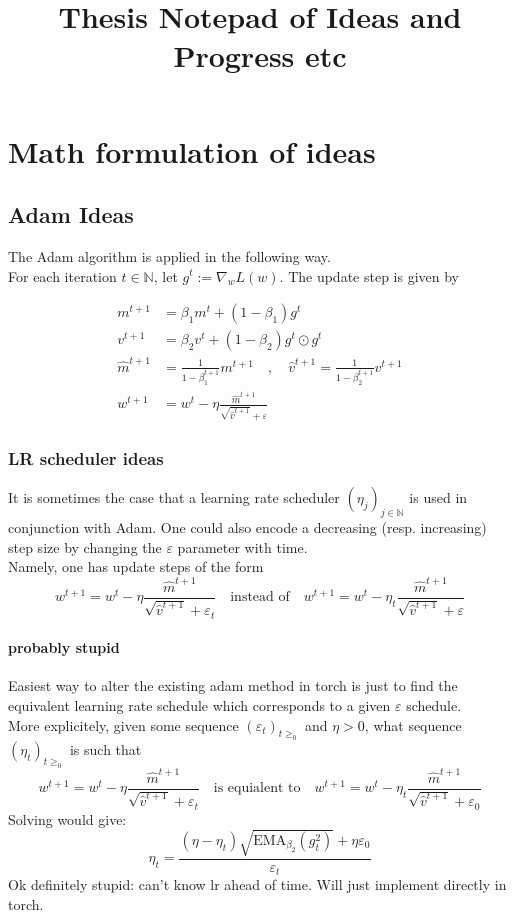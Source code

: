 \documentclass[12pt]{book}
\newcommand{\N}{\mathbb{N}}
\begin{document}
\title{Thesis Notepad of Ideas and Progress etc}
\maketitle
\tableofcontents
\chapter{Math formulation of ideas}
\section{Adam Ideas}
The Adam algorithm is applied in the following way. \\
For each iteration $t\in\N$, let $g^{t} := \nabla_{w}L(w)$. The update step is given by 

\begin{align*}
	m^{t+1} &= \beta_1 m^{t} + (1-\beta_1)g^{t} \\
	v^{t+1} &= \beta_2 v^{t} + (1-\beta_2) g^{t} \odot g^{t}\\
	\hat{m}^{t+1} &= \frac{1}{1-\beta_1^{t+1}} m^{t+1} \quad , \quad \hat{v}^{t+1} = \frac{1}{1-\beta_2^{t+1}} v^{t+1}\\
	w^{t+1} &= w^{t} - \eta \frac{\hat{m}^{t+1}}{\sqrt{\hat{v}^{t+1}} +\varepsilon }
\end{align*}

\subsection*{LR scheduler ideas}
It is sometimes the case that a learning rate scheduler $(\eta_{j})_{j\in\N} $ is used in conjunction with Adam. One could also encode a decreasing (resp. increasing) step size by changing the $\varepsilon $ parameter with time. 
\\
Namely, one has update steps of the form 
\[
w^{t+1} = w^{t} - \eta \frac{\hat{m}^{t+1}}{\sqrt{\hat{v}^{t+1}} + \varepsilon_t} \quad \text{instead of} \quad w^{t+1} = w^{t} - \eta_t \frac{\hat{m}^{t+1}}{\sqrt{\hat{v}^{t+1}} +\varepsilon }
\] 
\subsubsection*{probably stupid}
Easiest way to alter the existing adam method in torch is just to find the equivalent learning rate schedule which corresponds to a given  $\varepsilon $ schedule. \\ 	
More explicitely, given some sequence $(\varepsilon _{t})_{t\ge_0} $ and $\eta >0$, what sequence $(\eta_{t})_{t\ge_0 } $ is such that 
\[
w^{t+1} = w^{t} - \eta \frac{\hat{m}^{t+1}}{\sqrt{\hat{v}^{t+1}} + \varepsilon_t} \quad \text{is equialent to} \quad w^{t+1} = w^{t} - \eta_t \frac{\hat{m}^{t+1}}{\sqrt{\hat{v}^{t+1}} +\varepsilon_0 }
\] 
Solving would give:
\[
\eta_t = \frac{(\eta - \eta_t)\sqrt{\text{EMA}_{\beta_2}(g_t^2)} + \eta \varepsilon_0   }{\varepsilon _t}
\]
Ok definitely stupid: can't know lr ahead of time. 
Will just implement directly in torch.
\end{document}
